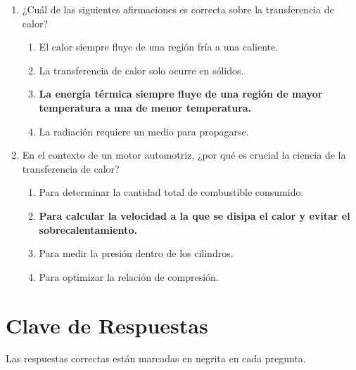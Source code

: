 \documentclass{article}
\begin{document}
\begin{enumerate}[label=\arabic*.]
    \item ¿Cuál de las siguientes afirmaciones es correcta sobre la transferencia de calor?
    \begin{enumerate}[label=\alph*)]
        \item El calor siempre fluye de una región fría a una caliente.
        \item La transferencia de calor solo ocurre en sólidos.
        \item \textbf{La energía térmica siempre fluye de una región de mayor temperatura a una de menor temperatura.}
        \item La radiación requiere un medio para propagarse.
    \end{enumerate}

    \item En el contexto de un motor automotriz, ¿por qué es crucial la ciencia de la transferencia de calor?
    \begin{enumerate}[label=\alph*)]
        \item Para determinar la cantidad total de combustible consumido.
        \item \textbf{Para calcular la velocidad a la que se disipa el calor y evitar el sobrecalentamiento.}
        \item Para medir la presión dentro de los cilindros.
        \item Para optimizar la relación de compresión.
    \end{enumerate}

\end{enumerate}

\section*{Clave de Respuestas}
Las respuestas correctas están marcadas en negrita en cada pregunta.
\end{document}
